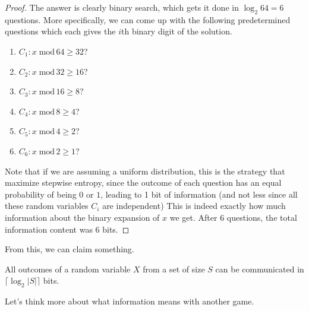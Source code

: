 \documentclass{article}
\begin{document}
    \begin{proof}
      The answer is clearly binary search, which gets it done in $\log_2 64 = 6$ questions. More specifically, we can come up with the following predetermined questions which each gives the $i$th binary digit of the solution. 
      \begin{enumerate}
        \item $C_1: x \; \mathrm{mod} \, 64 \geq 32$? 
        \item $C_2: x \; \mathrm{mod} \, 32 \geq 16$? 
        \item $C_3: x \; \mathrm{mod} \, 16 \geq 8$? 
        \item $C_4: x \; \mathrm{mod} \, 8 \geq 4$? 
        \item $C_5: x \; \mathrm{mod} \, 4 \geq 2$? 
        \item $C_6: x \; \mathrm{mod} \, 2 \geq 1$? 
      \end{enumerate}
      Note that if we are assuming a uniform distribution, this is the strategy that maximize stepwise entropy, since the outcome of each question has an equal probability of being $0$ or $1$, leading to 1 bit of information (and not less since all these random variables $C_i$ are independent) This is indeed exactly how much information about the binary expansion of $x$ we get. After 6 questions, the total information content was 6 bits. 
    \end{proof}

    From this, we can claim something. 

    \begin{lemma}
      All outcomes of a random variable $X$ from a set of size $S$ can be communicated in $\lceil \log_2 |S| \rceil$ bits. 
    \end{lemma}

    Let's think more about what information means with another game. 
\end{document}

